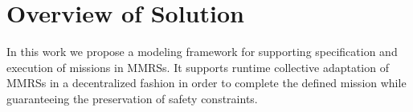 \documentclass[journal]{IEEEtran}
\theoremstyle{definition}
\begin{document}

\section{Overview of Solution}

In this work we propose a modeling framework for supporting specification and execution of missions in MMRSs. It supports runtime collective adaptation of MMRSs in a decentralized fashion in order to complete the defined mission while guaranteeing the preservation of safety constraints. 
\end{document}
